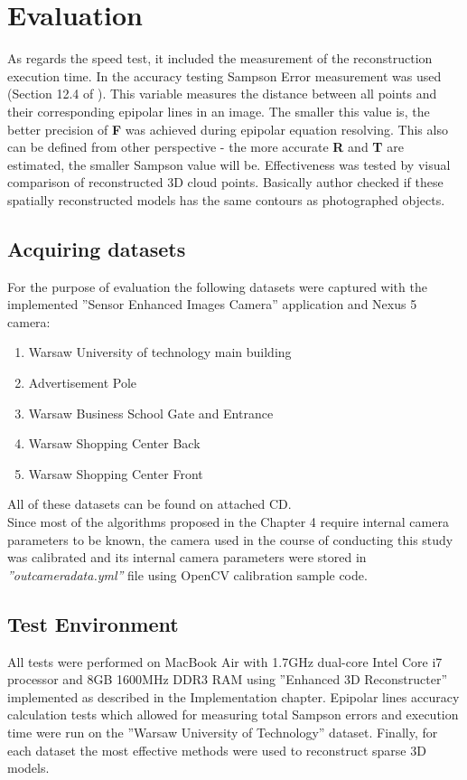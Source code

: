 \section{Evaluation}
As regards the speed test, it included the measurement of the reconstruction execution time. In the accuracy testing Sampson Error measurement was used (Section 12.4 of \cite{HartleyMultipleView}). This variable measures the distance between all points and their corresponding epipolar lines in an image. The smaller this value is, the better precision of \textbf{F} was achieved during epipolar equation resolving. This also can be defined from other perspective - the more accurate \textbf{R} and \textbf{T} are estimated, the smaller Sampson value will be. Effectiveness was tested by visual comparison of reconstructed 3D cloud points. Basically author checked if these spatially reconstructed models has the same contours as photographed objects.

\subsection{Acquiring datasets}
For the purpose of evaluation the following datasets were captured with the implemented ''Sensor Enhanced Images Camera'' application and Nexus 5 camera:
\begin{enumerate} 
\item Warsaw University of technology main building
\item Advertisement Pole 
\item Warsaw Business School Gate and Entrance
\item Warsaw Shopping Center Back
\item Warsaw Shopping Center Front
\end{enumerate}
All of these datasets can be found on attached CD. \\ 
Since most of the algorithms proposed in the Chapter 4 require internal camera parameters to be known, the camera used in the course of conducting this study was calibrated and its internal camera parameters were stored in \textit{''outcameradata.yml''} file using OpenCV calibration sample code. 
\subsection{Test Environment}
All tests were performed on MacBook Air with 1.7GHz dual-core Intel Core i7 processor and 8GB 1600MHz DDR3 RAM using ''Enhanced 3D Reconstructer'' implemented as described in the Implementation chapter. Epipolar lines accuracy calculation tests which allowed for measuring total Sampson errors and execution time were run on the ''Warsaw University of Technology'' dataset. Finally, for each dataset the most effective methods were used to reconstruct sparse 3D models. 
